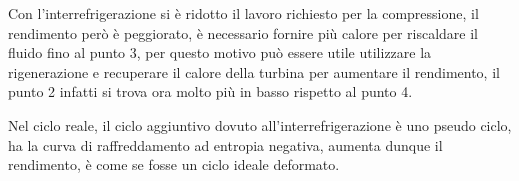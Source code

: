 Con l'interrefrigerazione si è ridotto il lavoro richiesto per la compressione,
il rendimento però è peggiorato, è necessario fornire più calore per riscaldare
il fluido fino al punto 3, per questo motivo può essere utile utilizzare la
rigenerazione e recuperare il calore della turbina per aumentare il rendimento,
il punto 2 infatti si trova ora molto più in basso rispetto al punto 4.

Nel ciclo reale, il ciclo aggiuntivo dovuto all'interrefrigerazione è uno
pseudo ciclo, ha la curva di raffreddamento ad entropia negativa, aumenta
dunque il rendimento, è come se fosse un ciclo ideale deformato.

